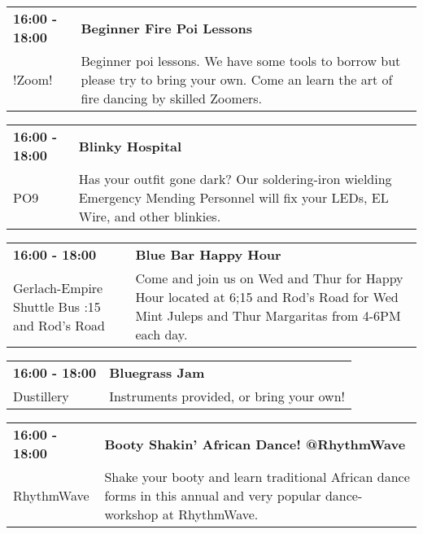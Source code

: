 \begin{tabular}{ p{1in} p{2.2in} }
    \textbf{16:00 - 18:00} & \textbf{Beginner Fire Poi Lessons} \\
    !Zoom! \newline  & Beginner poi lessons. We have some tools to borrow but please try to bring your own.  Come an learn the art of fire dancing by skilled Zoomers. \\
    \hline 
\end{tabular}
    
\begin{tabular}{ p{1in} p{2.2in} }
    \textbf{16:00 - 18:00} & \textbf{Blinky Hospital} \\
    PO9 \newline  & Has your outfit gone dark?  Our soldering-iron wielding Emergency Mending Personnel will fix your LEDs, EL Wire, and other blinkies. \\
    \hline 
\end{tabular}
    
\begin{tabular}{ p{1in} p{2.2in} }
    \textbf{16:00 - 18:00} & \textbf{Blue Bar Happy Hour} \\
    Gerlach-Empire Shuttle Bus \newline 6:15 and Rod's Road & Come and join us on Wed and Thur for Happy Hour located at 6;15 and Rod's Road for Wed Mint Juleps and Thur Margaritas from 4-6PM each day. \\
    \hline 
\end{tabular}
    
\begin{tabular}{ p{1in} p{2.2in} }
    \textbf{16:00 - 18:00} & \textbf{Bluegrass Jam} \\
    Dustillery \newline  & Instruments provided, or bring your own! \\
    \hline 
\end{tabular}
    
\begin{tabular}{ p{1in} p{2.2in} }
    \textbf{16:00 - 18:00} & \textbf{Booty Shakin' African Dance! @RhythmWave} \\
    RhythmWave \newline  & Shake your booty and learn traditional African dance forms in this annual and very popular dance-workshop at RhythmWave. \\
    \hline 
\end{tabular}
    
